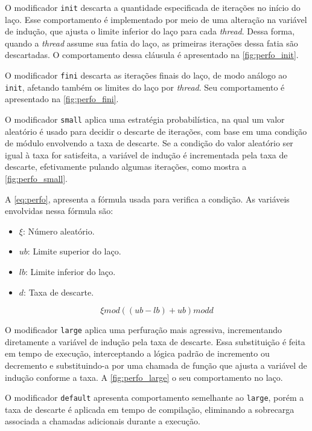 O modificador \texttt{init} descarta a quantidade especificada de iterações no início do laço.
Esse comportamento é implementado por meio de uma alteração na variável de indução, que ajusta o limite inferior do laço para cada \textit{thread}.
Dessa forma, quando a \textit{thread} assume sua fatia do laço, as primeiras iterações dessa fatia são descartadas. O comportamento dessa cláusula é apresentado na \autoref{fig:perfo_init}.

O modificador \texttt{fini} descarta as iterações finais do laço, de modo análogo ao \texttt{init}, afetando também os limites do laço por \textit{thread}. Seu comportamento é apresentado na \autoref{fig:perfo_fini}.

O modificador \texttt{small} aplica uma estratégia probabilística, na qual um valor aleatório é usado para decidir o descarte de iterações, com base em uma condição de módulo envolvendo a taxa de descarte.
Se a condição do valor aleatório ser igual à taxa for satisfeita, a variável de indução é incrementada pela taxa de descarte, efetivamente pulando algumas iterações, como mostra a \autoref{fig:perfo_small}.

A \autoref{eq:perfo}, apresenta a fórmula usada para verifica a condição. As variáveis envolvidas nessa fórmula são:

\begin{itemize}
    \item $\xi$: Número aleatório.
    \item $ub$: Limite superior do laço.
    \item $lb$: Limite inferior do laço.
    \item $d$: Taxa de descarte.
\end{itemize}

\begin{equation}
    \label{eq:perfo}
    \xi mod ((ub - lb) + ub) mod d
\end{equation}

O modificador \texttt{large} aplica uma perfuração mais agressiva, incrementando diretamente a variável de indução pela taxa de descarte.
Essa substituição é feita em tempo de execução, interceptando a lógica padrão de incremento ou decremento e substituindo-a por uma chamada de função que ajusta a variável de indução conforme a taxa. A \autoref{fig:perfo_large} o seu comportamento no laço.

O modificador \texttt{default} apresenta comportamento semelhante ao \texttt{large}, porém a taxa de descarte é aplicada em tempo de compilação, eliminando a sobrecarga associada a chamadas adicionais durante a execução.

